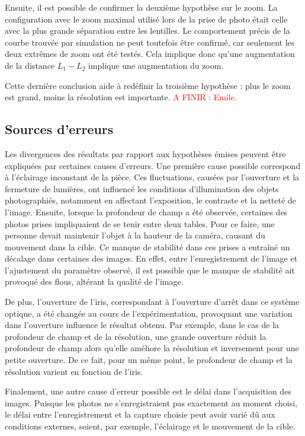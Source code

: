 \documentclass[11pt,letterpaper]{article}
\begin{document}

Ensuite, il est possible de confirmer la deuxième hypothèse sur le zoom. La
configuration avec le zoom maximal utilisé lors de la prise de photo était celle avec
la plus grande séparation entre les lentilles. Le comportement précis de la courbe
trouvée par simulation ne peut toutefois être confirmé, car seulement les deux extrêmes
de zoom ont été testés. Cela implique donc qu'une augmentation de la distance $L_1 - L_2$ implique une augmentation du zoom.

Cette dernière conclusion aide à redéfinir la troisième hypothèse : plus le zoom est
grand, moins la résolution est importante. \textcolor{red}{A FINIR : Emile}.

\subsection{Sources d'erreurs}
Les divergences des résultats par rapport aux hypothèses émises peuvent être expliquées par certaines causes d'erreurs. Une première cause possible correspond à l'éclairage inconstant de la pièce. Ces fluctuations, causées par l'ouverture et la fermeture de lumières, ont influencé les conditions d'illumination des objets photographiés, notamment en affectant l'exposition, le contraste et la netteté de l'image. Ensuite, lorsque la profondeur de champ a été observée, certaines des photos prises impliquaient de se tenir entre deux tables. Pour ce faire, une personne devait maintenir l'objet à la hauteur de la caméra, causant du mouvement dans la cible. Ce manque de stabilité dans ces prises a entraîné un décalage dans certaines des images. En effet, entre l'enregistrement de l'image et l'ajustement du paramètre observé, il est possible que le manque de stabilité ait provoqué des flous, altérant la qualité de l'image. 

De plus, l'ouverture de l'iris, correspondant à l'ouverture d'arrêt dans ce système optique, a été changée au cours de l'expérimentation, provoquant une variation dans l'ouverture influence le résultat obtenu. Par exemple, dans le cas de la profondeur de champ et de la résolution, une grande ouverture réduit la profondeur de champ alors qu'elle améliore la résolution et inversement pour une petite ouverture. De ce fait, pour un même point, le profondeur de champ et la résolution varient en fonction de l'iris.

Finalement, une autre cause d'erreur possible est le délai dans l'acquisition des images. Puisque les photos ne s'enregistraient pas exactement au moment choisi, le délai entre l'enregistrement et la capture choisie peut avoir varié dû aux conditions externes, soient, par exemple, l'éclairage et le mouvement de la cible.
\end{document}
